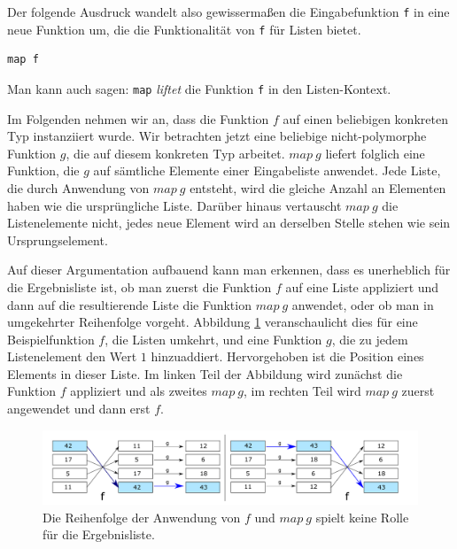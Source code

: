 Der folgende Ausdruck wandelt also gewissermaßen die Eingabefunktion \texttt{f} in eine neue Funktion um, die die Funktionalität von
\texttt{f} für Listen bietet.

\begin{verbatim}
map f
\end{verbatim}

Man kann auch sagen: \texttt{map} \textit{liftet} die Funktion \texttt{f} in den Listen-Kontext.

Im Folgenden nehmen wir an, dass die Funktion $f$ auf einen beliebigen konkreten Typ instanziiert wurde.
Wir betrachten jetzt eine beliebige nicht-polymorphe Funktion $g$, die auf diesem konkreten Typ arbeitet. $map\ g$ liefert folglich eine Funktion,
die $g$ auf sämtliche Elemente einer Eingabeliste
anwendet. Jede Liste, die durch Anwendung von $map\ g$ entsteht, wird die gleiche Anzahl an Elementen haben wie die ursprüngliche Liste.
Darüber hinaus vertauscht $map\ g$ die Listenelemente nicht, jedes neue Element wird an derselben Stelle stehen wie
sein Ursprungselement.

Auf dieser Argumentation aufbauend kann man erkennen, dass es unerheblich für die Ergebnisliste ist, ob man zuerst die
Funktion $f$ auf eine Liste appliziert und dann auf die resultierende Liste die Funktion $map\ g$ anwendet, oder ob man
in umgekehrter Reihenfolge vorgeht. Abbildung \ref{fig:fmapg} veranschaulicht dies für eine Beispielfunktion $f$, die Listen
umkehrt, und eine Funktion $g$, die zu jedem Listenelement den Wert $1$ hinzuaddiert. Hervorgehoben ist die Position
eines Elements in dieser Liste. Im linken Teil der Abbildung wird zunächst die Funktion $f$ appliziert und als zweites
$map\ g$, im rechten Teil wird $map\ g$ zuerst angewendet und dann erst $f$.

\begin{figure}[ht]
\centering
\includegraphics[width=430px]{fmapg}
\caption{Die Reihenfolge der Anwendung von $f$ und $map\ g$ spielt keine Rolle für die Ergebnisliste.}
\label{fig:fmapg}
\end{figure}


